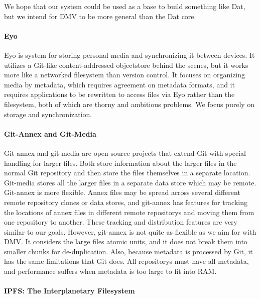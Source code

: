 We hope that our system could be used as a base to build something like Dat, but
we intend for \gls{DMV} to be more general than the Dat core.


\paragraph{Eyo}

Eyo \cite{Strauss:2011:EDP:2002181.2002216} is system for storing personal media
and synchronizing it between devices. It utilizes a Git-like content-addressed
\gls{objectstore} behind the scenes, but it works more like a networked filesystem
than version control. It focuses on organizing media by metadata, which requires
agreement on metadata formats, and it requires applications to be rewritten to
access files via Eyo rather than the filesystem, both of which are thorny and
ambitious problems. We focus purely on storage and synchronization.


\paragraph{Git-Annex and Git-Media}

Git-annex \cite{git_annex_homepage} and git-media \cite{git_media_github} are
open-source projects that extend Git with special handling for larger files.
Both store information about the larger files in the normal Git \gls{repository}
and then store the files themselves in a separate location. Git-media stores all
the larger files in a separate data store which may be remote. Git-annex is more
flexible. Annex files may be spread across several different remote
\gls{repository} clones or data stores, and git-annex has features for tracking
the locations of annex files in different remote \glspl{repository} and moving
them from one \gls{repository} to another. These tracking and distribution
features are very similar to our goals. However, git-annex is not quite as
flexible as we aim for with \gls{DMV}. It considers the large files atomic
units, and it does not break them into smaller chunks for de-duplication. Also,
because metadata is processed by Git, it has the same limitations that Git does.
All \glspl{repository} must have all metadata, and performance suffers when
metadata is too large to fit into RAM.


\paragraph{IPFS: The Interplanetary Filesystem}

